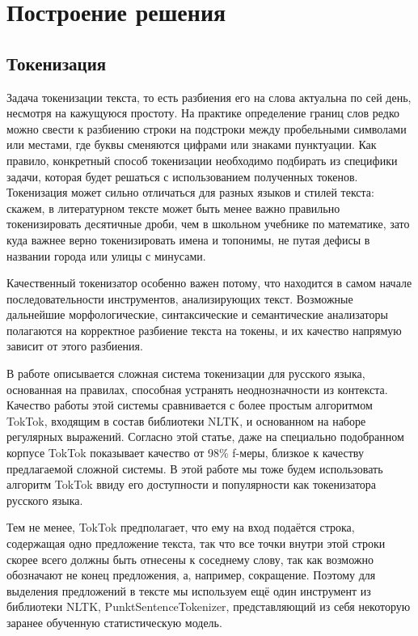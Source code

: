 \documentclass[14pt,russian]{extreport}
\begin{document}
\chapter{Построение решения}

\section{Токенизация}

Задача токенизации текста, то есть разбиения его на слова актуальна\cite{2014nkra,2016kvoprosu,2012opencorpora} по сей день,
несмотря на кажущуюся простоту.
На практике определение границ слов редко можно свести к разбиению строки на
подстроки между пробельными символами или местами, где буквы сменяются цифрами
или знаками пунктуации.
Как правило, конкретный способ токенизации необходимо подбирать из специфики
задачи, которая будет решаться с использованием полученных токенов.
Токенизация может сильно отличаться для разных языков и стилей текста: скажем,
в литературном тексте может быть менее важно правильно токенизировать
десятичные дроби, чем в школьном учебнике по математике, зато куда важнее верно
токенизировать имена и топонимы, не путая дефисы в названии города или улицы с
минусами.

Качественный токенизатор особенно важен потому, что находится в самом начале
последовательности инструментов, анализирующих текст. Возможные дальнейшие
морфологические, синтаксические и семантические анализаторы полагаются на
корректное разбиение текста на токены, и их качество напрямую зависит от этого
разбиения.

В работе \cite{rus_tokenization} описывается сложная система токенизации
для русского языка, основанная на правилах, способная устранять неоднозначности
из контекста. Качество работы этой системы сравнивается с более простым
алгоритмом TokTok, входящим в состав библиотеки NLTK\cite{Loper:2002:NNL:1118108.1118117}, и основанном на наборе
регулярных выражений. Согласно этой статье, даже на специально подобранном
корпусе TokTok показывает качество от 98\% f-меры, близкое к качеству
предлагаемой сложной системы. В этой работе мы тоже будем использовать алгоритм
TokTok ввиду его доступности и популярности как токенизатора русского языка.

Тем не менее, TokTok предполагает, что ему на вход подаётся строка, содержащая
одно предложение текста, так что все точки внутри этой строки скорее всего
должны быть отнесены к соседнему слову, так как возможно обозначают не конец
предложения, а, например, сокращение. Поэтому для выделения предложений в
тексте мы используем ещё один инструмент из библиотеки NLTK,
PunktSentenceTokenizer, представляющий из себя некоторую заранее обученную
статистическую модель.
\end{document}
